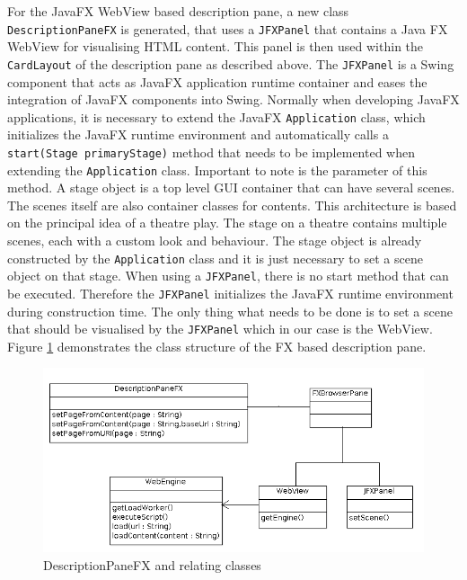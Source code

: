 For the JavaFX WebView based description pane, a new class \texttt{DescriptionPaneFX} is generated, that uses a \texttt{JFXPanel} that contains a Java FX WebView for visualising HTML content.
This panel is then used within the \texttt{CardLayout} of the description pane as described above.
The \texttt{JFXPanel} is a Swing component that acts as JavaFX application runtime container and eases the integration of JavaFX components into Swing.
Normally when developing JavaFX applications, it is necessary to extend the JavaFX \texttt{Application} class, which initializes the JavaFX runtime environment and automatically calls a \texttt{start(Stage primaryStage)} method that needs to be implemented when extending the \texttt{Application} class.
Important to note is the parameter of this method.
A stage object is a top level GUI container that can have several scenes.
The scenes itself are also container classes for contents.
This architecture is based on the principal idea of a theatre play.
The stage on a theatre contains multiple scenes, each with a custom look and behaviour.
The stage object is already constructed by the \texttt{Application} class and it is just necessary to set a scene object on that stage.
When using a \texttt{JFXPanel}, there is no start method that can be executed.
Therefore the \texttt{JFXPanel} initializes the JavaFX runtime environment during construction time.
The only thing what needs to be done is to set a scene that should be visualised by the \texttt{JFXPanel} which in our case is the WebView.
Figure \ref{fig:class_diag_desc_pane_fx} demonstrates the class structure of the FX based description pane.

\begin{figure}
	\centering	\includegraphics[width=1.0\textwidth]{./img/classDiagramms/desc_pane_fx.png}
	\caption{DescriptionPaneFX and relating classes}
	\label{fig:class_diag_desc_pane_fx}
\end{figure}

